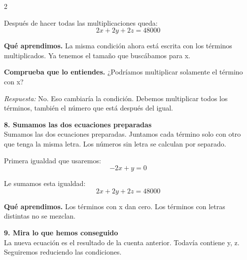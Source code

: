 \documentclass[11pt,a4paper,landscape]{article}
\begin{document}
\begin{multicols*}{2}
\begin{minipage}{\linewidth}
\par\smallskip Después de hacer todas las multiplicaciones queda:
\[2x + 2y + 2z = 48000\]
\par\smallskip\textbf{Qué aprendimos.} La misma condición ahora está escrita con los términos multiplicados. Ya tenemos el tamaño que buscábamos para x.
\par\smallskip\textbf{Comprueba que lo entiendes.} ¿Podríamos multiplicar solamente el término con x?\par\textit{Respuesta:} No. Eso cambiaría la condición. Debemos multiplicar todos los términos, también el número que está después del igual.
\end{minipage}\par\medskip
\noindent\begin{minipage}{\linewidth}\textbf{8. Sumamos las dos ecuaciones preparadas}\\[2pt]Sumamos las dos ecuaciones preparadas. Juntamos cada término solo con otro que tenga la misma letra. Los números sin letra se calculan por separado.
\par{}\par\smallskip
\par\smallskip Primera igualdad que usaremos:
\[-2x + y = 0\]
\par\smallskip Le sumamos esta igualdad:
\[2x + 2y + 2z = 48000\]
\par\smallskip\textbf{Qué aprendimos.} Los términos con x dan cero. Los términos con letras distintas no se mezclan.
\end{minipage}\par\medskip
\noindent\begin{minipage}{\linewidth}\textbf{9. Mira lo que hemos conseguido}\\[2pt]La nueva ecuación es el resultado de la cuenta anterior. Todavía contiene y, z. Seguiremos reduciendo las condiciones.

\end{minipage}
\end{multicols*}
\end{document}
